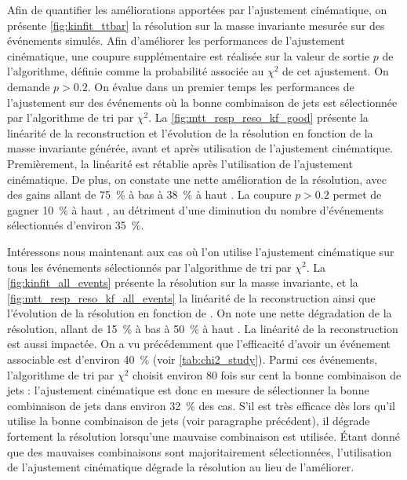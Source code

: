 Afin de quantifier les améliorations apportées par l'ajustement cinématique, on présente \cref{fig:kinfit_ttbar} la résolution sur la masse invariante mesurée sur des événements \ttbar simulés. Afin d'améliorer les performances de l'ajustement cinématique, une coupure supplémentaire est réalisée sur la valeur de sortie $p$ de l'algorithme, définie comme la probabilité associée au $\chi^2$ de cet ajustement. On demande $p > \num{0.2}$. On évalue dans un premier temps les performances de l'ajustement sur des événements où la bonne combinaison de jets est sélectionnée par l'algorithme de tri par $\chi^2$. La \cref{fig:mtt_resp_reso_kf_good} présente la linéarité de la reconstruction et l'évolution de la résolution en fonction de la masse invariante \ttbar générée, avant et après utilisation de l'ajustement cinématique. Premièrement, la linéarité est rétablie après l'utilisation de l'ajustement cinématique. De plus, on constate une nette amélioration de la résolution, avec des gains allant de \tilde\SI{75}{\%} à bas \mtt à \tilde\SI{38}{\%} à haut \mtt. La coupure $p > \num{0.2}$ permet de gagner \tilde\SI{10}{\%} à haut \mtt, au détriment d'une diminution du nombre d'événements sélectionnés d'environ \SI{35}{\%}.

Intéressons nous maintenant aux cas où l'on utilise l'ajustement cinématique sur tous les événements sélectionnés par l'algorithme de tri par $\chi^2$. La \cref{fig:kinfit_all_events} présente la résolution sur la masse invariante, et la \cref{fig:mtt_resp_reso_kf_all_events} la linéarité de la reconstruction ainsi que l'évolution de la résolution en fonction de \mttgen. On note une nette dégradation de la résolution, allant de \tilde\SI{15}{\%} à bas \mtt à \tilde\SI{50}{\%} à haut \mtt. La linéarité de la reconstruction est aussi impactée. On a vu précédemment que l'efficacité d'avoir un événement associable est d'environ \SI{40}{\%} (voir \cref{tab:chi2_study}). Parmi ces événements, l'algorithme de tri par $\chi^2$ choisit environ \num{80} fois sur cent la bonne combinaison de jets : l'ajustement cinématique est donc en mesure de sélectionner la bonne combinaison de jets dans environ \SI{32}{\%} des cas. S'il est très efficace dès lors qu'il utilise la bonne combinaison de jets (voir paragraphe précédent), il dégrade fortement la résolution lorsqu'une mauvaise combinaison est utilisée. Étant donné que des mauvaises combinaisons sont majoritairement sélectionnées, l'utilisation de l'ajustement cinématique dégrade la résolution au lieu de l'améliorer.

\bigskip


